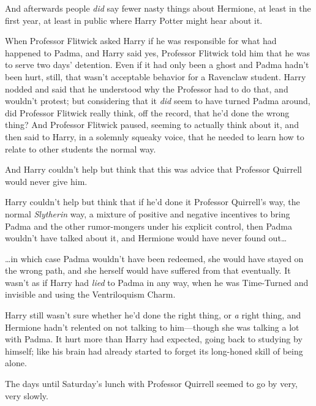 And afterwards people \emph{did} say fewer nasty things about Hermione, at least in the first year, at least in public where Harry Potter might hear about it.

When Professor Flitwick asked Harry if he was responsible for what had happened to Padma, and Harry said yes, Professor Flitwick told him that he was to serve two days' detention. Even if it had only been a ghost and Padma hadn't been hurt, still, that wasn't acceptable behavior for a Ravenclaw student. Harry nodded and said that he understood why the Professor had to do that, and wouldn't protest; but considering that it \emph{did} seem to have turned Padma around, did Professor Flitwick really think, off the record, that he'd done the wrong thing? And Professor Flitwick paused, seeming to actually think about it, and then said to Harry, in a solemnly squeaky voice, that he needed to learn how to relate to other students the normal way.

And Harry couldn't help but think that this was advice that Professor Quirrell would never give him.

Harry couldn't help but think that if he'd done it Professor Quirrell's way, the normal \emph{Slytherin} way, a mixture of positive and negative incentives to bring Padma and the other rumor-mongers under his explicit control, then Padma wouldn't have talked about it, and Hermione would have never found out{\ldots}

{\ldots}in which case Padma wouldn't have been redeemed, she would have stayed on the wrong path, and she herself would have suffered from that eventually. It wasn't as if Harry had \emph{lied} to Padma in any way, when he was Time-Turned and invisible and using the Ventriloquism Charm.

Harry still wasn't sure whether he'd done the right thing, or \emph{a} right thing, and Hermione hadn't relented on not talking to him—though she was talking a lot with Padma. It hurt more than Harry had expected, going back to studying by himself; like his brain had already started to forget its long-honed skill of being alone.

The days until Saturday's lunch with Professor Quirrell seemed to go by very, very slowly.

